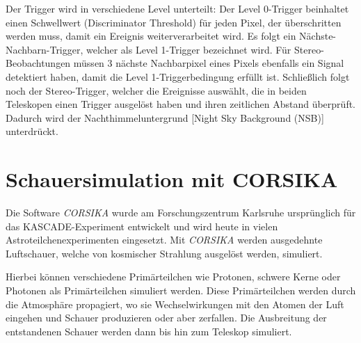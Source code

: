 Der Trigger wird in verschiedene Level unterteilt:
Der Level 0-Trigger beinhaltet einen Schwellwert (Discriminator Threshold) für jeden Pixel, der überschritten werden muss, damit ein Ereignis weiterverarbeitet wird.
Es folgt ein Nächste-Nachbarn-Trigger, welcher als Level 1-Trigger bezeichnet wird.
Für Stereo-Beobachtungen müssen 3 nächste Nachbarpixel eines Pixels ebenfalls ein Signal detektiert haben, damit die Level 1-Triggerbedingung erfüllt ist.\cite{DissMazin}
Schließlich folgt noch der Stereo-Trigger, welcher die Ereignisse auswählt, die in beiden Teleskopen einen Trigger ausgelöst haben und ihren zeitlichen Abstand überprüft.
Dadurch wird der Nachthimmeluntergrund [Night Sky Background (NSB)] unterdrückt.



\section{Schauersimulation mit CORSIKA}
\label{sec:Corsika}

Die Software \textit{CORSIKA} \cite{CORSIKA} wurde am Forschungszentrum Karlsruhe ursprünglich für das KASCADE-Experiment entwickelt und wird heute in vielen Astroteilchenexperimenten eingesetzt.
Mit \textit{CORSIKA} werden ausgedehnte Luftschauer, welche von kosmischer Strahlung ausgelöst werden, simuliert.

Hierbei können verschiedene Primärteilchen wie Protonen, schwere Kerne oder Photonen als Primärteilchen simuliert werden.
Diese Primärteilchen werden durch die Atmosphäre propagiert, wo sie Wechselwirkungen mit den Atomen der Luft eingehen und Schauer produzieren oder aber zerfallen.
Die Ausbreitung der entstandenen Schauer werden dann bis hin zum Teleskop simuliert.



